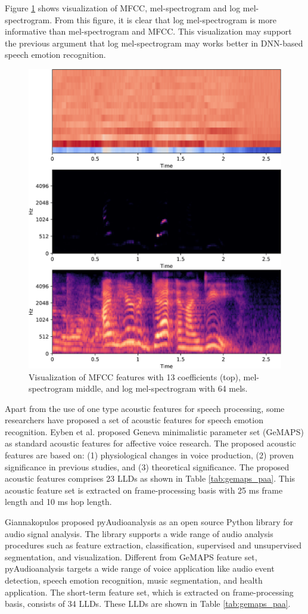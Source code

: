 Figure \ref{fig:mfcc-mel} shows visualization of MFCC, mel-spectrogram and log
mel-spectrogram. From this figure, it is clear that log mel-spectrogram is more
informative than mel-spectrogram and MFCC. This visualization may support the
previous argument that log mel-spectrogram may works better in DNN-based
speech emotion recognition.

\begin{figure}[htbp]
  \centering
  \includegraphics[width=.7\textwidth]{../fig/mfcc-mel-crop.pdf}
  \caption{Visualization of MFCC features with 13 coefficients (top), 
  mel-spectrogram middle, and log mel-spectrogram with 64 mels.}
  \label{fig:mfcc-mel}
\end{figure}

Apart from the use of one type acoustic features for speech processing, some
researchers have proposed a set of acoustic features for speech emotion
recognition. Eyben et al. \cite{Eyben} proposed Geneva minimalistic parameter
set (GeMAPS) as standard acoustic features for affective voice research. The
proposed acoustic features are based on: (1) physiological changes in voice
production, (2) proven significance in previous studies, and (3) theoretical
significance. The proposed acoustic features comprises 23 LLDs as shown in
Table \ref{tab:gemaps_paa}. This acoustic feature set is extracted on
frame-processing basis with 25 ms frame length and 10 ms hop length.

Giannakopulos \cite{Giannakopoulos2015} proposed pyAudioanalysis as an open
source Python library for audio signal analysis. The library supports a wide
range of audio analysis procedures such as feature extraction, classification,
supervised and unsupervised segmentation, and visualization. Different from
GeMAPS feature set, pyAudioanalysis targets a wide range of voice application
like audio event detection, speech emotion recognition, music segmentation, and
health application. The short-term feature set, which is extracted on
frame-processing basis, consists of 34 LLDs. These LLDs are shown in Table 
\ref{tab:gemaps_paa}.

